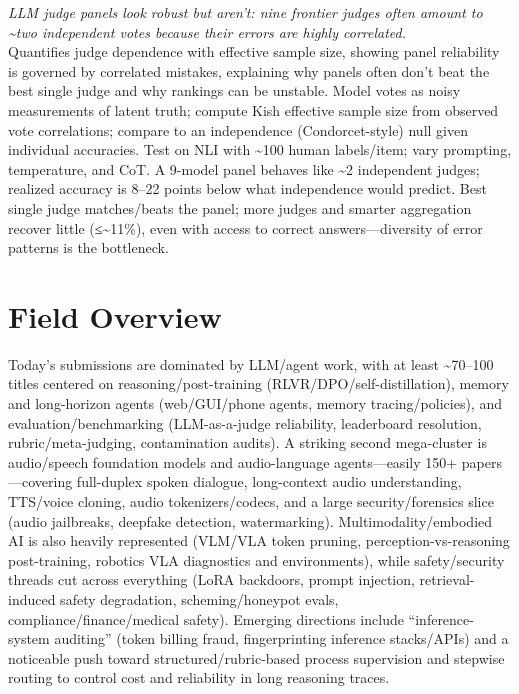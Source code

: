 \documentclass[12pt,letterpaper]{article}
\begin{document}
{\small\textit{LLM judge panels look robust but aren't: nine frontier judges often amount to \textasciitilde{}two independent votes because their errors are highly correlated.}}\\[1pt]
{\footnotesize Quantifies judge dependence with effective sample size, showing panel reliability is governed by correlated mistakes, explaining why panels often don't beat the best single judge and why rankings can be unstable. Model votes as noisy measurements of latent truth; compute Kish effective sample size from observed vote correlations; compare to an independence (Condorcet-style) null given individual accuracies. Test on NLI with \textasciitilde{}100 human labels/item; vary prompting, temperature, and CoT. A 9-model panel behaves like \textasciitilde{}2 independent judges; realized accuracy is 8--22 points below what independence would predict. Best single judge matches/beats the panel; more judges and smarter aggregation recover little (≤\textasciitilde{}11\%), even with access to correct answers---diversity of error patterns is the bottleneck.}

\medskip



\section*{Field Overview}
{\footnotesize Today's submissions are dominated by LLM/agent work, with at least \textasciitilde{}70--100 titles centered on reasoning/post-training (RLVR/DPO/self-distillation), memory and long-horizon agents (web/GUI/phone agents, memory tracing/policies), and evaluation/benchmarking (LLM-as-a-judge reliability, leaderboard resolution, rubric/meta-judging, contamination audits). A striking second mega-cluster is audio/speech foundation models and audio-language agents---easily 150+ papers---covering full-duplex spoken dialogue, long-context audio understanding, TTS/voice cloning, audio tokenizers/codecs, and a large security/forensics slice (audio jailbreaks, deepfake detection, watermarking). Multimodality/embodied AI is also heavily represented (VLM/VLA token pruning, perception-vs-reasoning post-training, robotics VLA diagnostics and environments), while safety/security threads cut across everything (LoRA backdoors, prompt injection, retrieval-induced safety degradation, scheming/honeypot evals, compliance/finance/medical safety). Emerging directions include ``inference-system auditing'' (token billing fraud, fingerprinting inference stacks/APIs) and a noticeable push toward structured/rubric-based process supervision and stepwise routing to control cost and reliability in long reasoning traces.}
\end{document}

